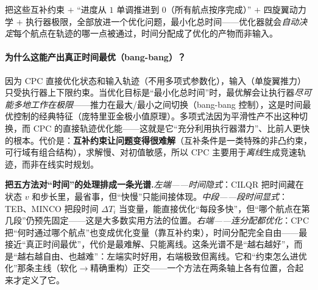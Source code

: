 \noindent{}把这些互补约束 $+$ “进度从 $1$ 单调推进到 $0$（所有航点按序完成）” $+$ 四旋翼动力学 $+$ 执行器极限，全部放进一个优化问题，最小化总时间——优化器就会\emph{自动决定}每个航点在轨迹的哪一点被通过，时间分配成了优化的产物而非输入。

\paragraph{为什么这能产出真正时间最优（bang-bang）？}
因为 CPC 直接优化状态和输入轨迹（不用多项式参数化），输入（单旋翼推力）只受执行器上下限约束。当优化目标是“最小化总时间”时，最优解会让执行器\emph{尽可能多地工作在极限}——推力在最大/最小之间切换（bang-bang 控制），这是时间最优控制的经典特征（庞特里亚金极小值原理）。多项式法因为平滑性产不出这种切换，而 CPC 的直接轨迹优化能——这就是它“充分利用执行器潜力”、比前人更快的根本。代价是：\textbf{互补约束让问题变得很难解}（互补条件是一类特殊的非凸约束，可行域有组合结构），求解慢、对初值敏感，所以 CPC 主要用于\emph{离线}生成竞速轨迹，而非在线实时规划。

\begin{insight}
\textbf{把五方法对“时间”的处理排成一条光谱.}\;\emph{左端——时间隐式}：CILQR 把时间藏在状态 $v$ 和步长里，最省事，但“快慢”只能间接体现。\emph{中段——段时间显式}：TEB、MINCO 把段时间 $\Delta T_i$ 当变量，能直接优化“每段多快”，但“哪个航点在第几段”仍预先固定——这是大多数实用方法的位置。\emph{右端——连分配都优化}：CPC 把“何时通过哪个航点”也变成优化变量（靠互补约束），时间分配完全自由——最接近“真正时间最优”，代价是最难解、只能离线。这条光谱不是“越右越好”，而是“越右越自由、也越难”：左端实时好用，右端极致但离线。它和“约束怎么进优化”那条主线（软化$\to$精确重构）正交——一个方法在两条轴上各有位置，合起来才定义了它。
\end{insight}

